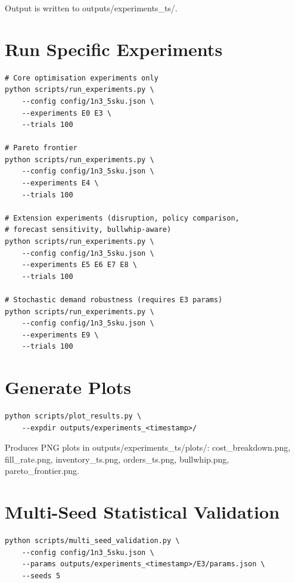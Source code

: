Output is written to outputs/experiments\_\textlangle ts\textrangle /.

\section*{Run Specific Experiments}

\begin{verbatim}
# Core optimisation experiments only
python scripts/run_experiments.py \
    --config config/1n3_5sku.json \
    --experiments E0 E3 \
    --trials 100

# Pareto frontier
python scripts/run_experiments.py \
    --config config/1n3_5sku.json \
    --experiments E4 \
    --trials 100

# Extension experiments (disruption, policy comparison,
# forecast sensitivity, bullwhip-aware)
python scripts/run_experiments.py \
    --config config/1n3_5sku.json \
    --experiments E5 E6 E7 E8 \
    --trials 100

# Stochastic demand robustness (requires E3 params)
python scripts/run_experiments.py \
    --config config/1n3_5sku.json \
    --experiments E9 \
    --trials 100
\end{verbatim}

\section*{Generate Plots}

\begin{verbatim}
python scripts/plot_results.py \
    --expdir outputs/experiments_<timestamp>/
\end{verbatim}

Produces PNG plots in outputs/experiments\_\textlangle ts\textrangle /plots/:
cost\_breakdown.png, fill\_rate.png,
inventory\_ts.png, orders\_ts.png,
bullwhip.png, pareto\_frontier.png.

\section*{Multi-Seed Statistical Validation}

\begin{verbatim}
python scripts/multi_seed_validation.py \
    --config config/1n3_5sku.json \
    --params outputs/experiments_<timestamp>/E3/params.json \
    --seeds 5
\end{verbatim}

